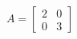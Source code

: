 \documentclass[preview]{standalone}
\begin{document}
\begin{align*}
A = \begin{bmatrix} 2 & 0 \\ 0 & 3 \end{bmatrix}
\end{align*}
\end{document}
